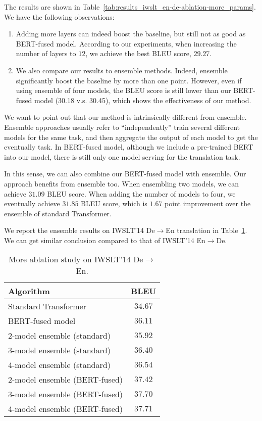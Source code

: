 \documentclass{article} \usepackage{iclr2020_conference,times}
\begin{document}
The results are shown in Table~\ref{tab:results_iwslt_en-de-ablation-more_params}. We have the following observations: 
\begin{enumerate}
\item Adding more layers can indeed boost the baseline, but still not as good as BERT-fused model. According to our experiments, when increasing the number of layers to $12$, we achieve the best BLEU score, $29.27$. \item We also compare our results to ensemble methods. Indeed, ensemble significantly boost the baseline by more than one point. However, even if using ensemble of four models, the BLEU score is still lower than our BERT-fused model (30.18 v.s. 30.45), which shows the effectiveness of our method. 
\end{enumerate}

We want to point out that our method is intrinsically different from ensemble. Ensemble approaches usually refer to ``independently'' train several different models for the same task, and then aggregate the output of each model to get the eventually task. In BERT-fused model, although we include a pre-trained BERT into our model, there is still only one model serving for the translation task.

In this sense, we can also combine our BERT-fused model with ensemble. Our approach benefits from ensemble too. When ensembling two models, we can achieve $31.09$ BLEU score. When adding the number of models to four, we eventually achieve $31.85$ BLEU score, which is $1.67$ point improvement over the ensemble of standard Transformer. 


We report the ensemble results on IWSLT'14 De$\to$En translation in Table~\ref{tab:results_iwslt_de2en-ablation-more_params}. We can get similar conclusion compared to that of IWSLT'14 En$\to$De. 

\begin{table}[!htbp]
\centering
\caption{More ablation study on IWSLT'14 De$\to$En.}
\begin{tabular}{lc}
\toprule
Algorithm & BLEU  \\
\midrule
Standard Transformer & $34.67$ \\
BERT-fused model & $36.11$ \\
\midrule
2-model ensemble (standard) & $35.92$  \\
3-model ensemble (standard) & $36.40$  \\
4-model ensemble (standard) & $36.54$  \\
\bottomrule
2-model ensemble (BERT-fused) & $37.42$  \\
3-model ensemble (BERT-fused) & $37.70$  \\
4-model ensemble (BERT-fused) & $37.71$  \\
\bottomrule
\end{tabular}
\label{tab:results_iwslt_de2en-ablation-more_params}
\end{table}
\end{document}
